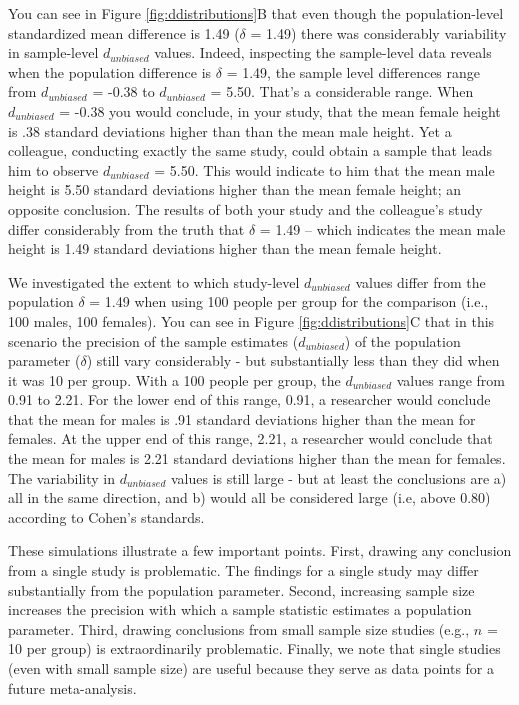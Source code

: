 \documentclass[
]{krantz}
\begin{document}
You can see in Figure \ref{fig:ddistributions}B that even though the population-level standardized mean difference is 1.49 (\(\delta\) = 1.49) there was considerably variability in sample-level \(d_{unbiased}\) values. Indeed, inspecting the sample-level data reveals when the population difference is \(\delta\) = 1.49, the sample level differences range from \(d_{unbiased}\) = -0.38 to \(d_{unbiased}\) = 5.50. That's a considerable range. When \(d_{unbiased}\) = -0.38 you would conclude, in your study, that the mean female height is .38 standard deviations higher than than the mean male height. Yet a colleague, conducting exactly the same study, could obtain a sample that leads him to observe \(d_{unbiased}\) = 5.50. This would indicate to him that the mean male height is 5.50 standard deviations higher than the mean female height; an opposite conclusion. The results of both your study and the colleague's study differ considerably from the truth that \(\delta\) = 1.49 -- which indicates the mean male height is 1.49 standard deviations higher than the mean female height.

We investigated the extent to which study-level \(d_{unbiased}\) values differ from the population \(\delta\) = 1.49 when using 100 people per group for the comparison (i.e., 100 males, 100 females).
You can see in Figure \ref{fig:ddistributions}C that in this scenario the precision of the sample estimates (\(d_{unbiased}\)) of the population parameter (\(\delta\)) still vary considerably - but substantially less than they did when it was 10 per group. With a 100 people per group, the \(d_{unbiased}\) values range from 0.91 to 2.21. For the lower end of this range, 0.91, a researcher would conclude that the mean for males is .91 standard deviations higher than the mean for females. At the upper end of this range, 2.21, a researcher would conclude that the mean for males is 2.21 standard deviations higher than the mean for females. The variability in \(d_{unbiased}\) values is still large - but at least the conclusions are a) all in the same direction, and b) would all be considered large (i.e, above 0.80) according to Cohen's standards.

These simulations illustrate a few important points. First, drawing any conclusion from a single study is problematic. The findings for a single study may differ substantially from the population parameter. Second, increasing sample size increases the precision with which a sample statistic estimates a population parameter. Third, drawing conclusions from small sample size studies (e.g., \(n\) = 10 per group) is extraordinarily problematic. Finally, we note that single studies (even with small sample size) are useful because they serve as data points for a future meta-analysis.
\end{document}
